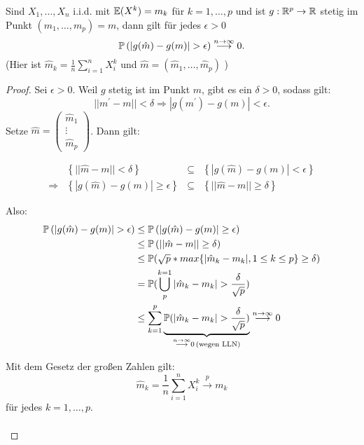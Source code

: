 \documentclass{tstextbook}
\begin{document}
\begin{lemma}
	\label{lemma_stetig}
	Sind $ X_1,\ldots, X_n $ i.i.d. mit $ \mathbb E(X^k) = m_k $ für $ k = 1,\ldots, p $ und ist $ g:\mathbb R^p \rightarrow \mathbb R $ stetig im Punkt $ \left(m_1, \ldots, m_p \right) = m $, dann gilt für jedes $ \epsilon > 0 $
	\[
	\mathbb P\left(|g(\hat{m})-g(m)| > \epsilon \right) \overset{n\to\infty}{\longrightarrow} 0.
	\]
	(Hier ist $ \hat{m}_k = \frac{1}{n} \sum_{i=1}^{n} X_i^k $ und   $ \hat{m}= \left(\hat{m}_1, \ldots, \hat{m}_p \right) $ )
\end{lemma}

\begin{proof}
	Sei $ \epsilon > 0 $. Weil $ g $ stetig ist im Punkt $ m $, gibt es ein $ \delta > 0 $, sodass gilt: 
	\[ ||m^\prime - m|| < \delta \Rightarrow |g(m^\prime) - g(m)| < \epsilon. \]
	Setze $ \hat{m} = \begin{pmatrix}
		\hat{m}_1 \\ \vdots \\ \hat{m}_p
	\end{pmatrix} $. Dann gilt:

	\[
	\begin{aligned}
		\; & \left\lbrace||\hat{m} - m|| < \delta \right\rbrace & \subseteq & \left\lbrace|g(\hat{m}) - g(m)| < \epsilon \right\rbrace \\
		\Rightarrow	& \left\lbrace|g(\hat{m}) - g(m)| \ge \epsilon \right\rbrace & \subseteq & \left\lbrace||\hat{m} - m|| \ge \delta \right\rbrace
	\end{aligned}
	\]
	
	Also: 
	\[
	\begin{aligned}
		\Prob\left(|g(\hat{m})-g(m)|>\epsilon \right) & \le \Prob\left(|g(\hat{m})-g(m)|\ge\epsilon \right) \\
		& \le \Prob\left(||\hat{m}-m||\ge \delta \right) \\
		& \leq \Prob(\sqrt{p}* max \{ |\hat{m}_k-m_k |, 1 \leq k \leq p \} \geq \delta ) \\
		& = \Prob(\bigcup^{k=1}_{p} {|\hat{m}_k-m_k |} > \frac{\delta}{\sqrt{p}} ) \\
		& \leq \sum_{k=1}^{p} \underbrace{\Prob(|\hat{m}_k-m_k |> \frac{\delta}{\sqrt{p}})}_{\overset{n\to\infty}{\longrightarrow} 0 \, (\text{wegen LLN})}  \overset{n\to \infty}{\longrightarrow} 0 \\
	\end{aligned}
	\]
	
	Mit dem Gesetz der großen Zahlen gilt: 
	\[
	\hat{m}_k = \frac{1}{n} \sum_{i=1}^{n} X_i^k \overset{p}{\longrightarrow} m_k \tag{$\hexstar\hexstar$}
	\]
	für jedes $ k=1,\ldots, p $. 
	
	\[
	\begin{aligned}
	\end{aligned}
	\]
\end{proof}
\end{document}
